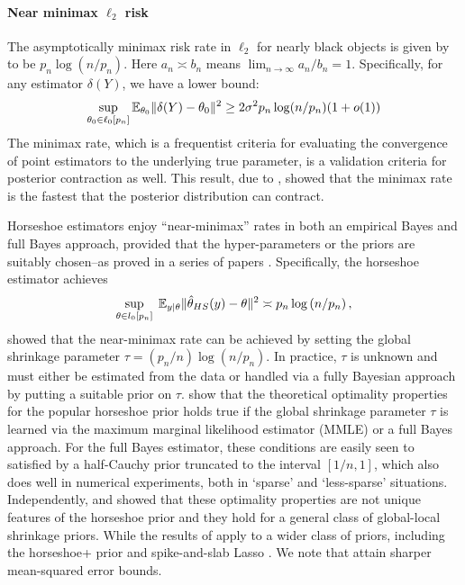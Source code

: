 \documentclass[11pt]{article}
\begin{document}
\paragraph{Near minimax $\ell_2$ risk}

The asymptotically minimax risk rate in $\ell_2$ for nearly black objects is
given by \citet{donoho1992maximum} to be $p_n \log \left ( n / p_n \right )$.
Here $a_n \asymp b_n$ means $\lim_{n\to\infty} a_n/b_n=1$. Specifically, for
any estimator $\delta(Y)$, we have a lower bound: 
\begin{equation}
  \sup_{\theta_0 \in \ell_0[p_n]} \mathbb E_{\theta_0} \lVert\delta(Y) - \theta_0\rVert^2
  \ge 2 \sigma^2 p_n \log(n/p_n)(1+o(1))
\end{equation}
The minimax rate, which is a frequentist criteria for evaluating the
convergence of point estimators to the underlying true parameter, is a
validation criteria for posterior contraction as well. This result, due to
\citet{ghosal2000}, showed that the minimax rate is the fastest that the
posterior distribution can contract. 

Horseshoe estimators enjoy ``near-minimax'' rates in both an empirical Bayes and
full Bayes approach, provided that the hyper-parameters or the priors are
suitably chosen--as proved in a series of papers
\citep{van2014horseshoe,van2015conditions,van2016many,van2017adaptive}.
Specifically, the horseshoe estimator achieves
\begin{equation}
  \sup_{ \theta \in l_0[p_n] } \; \mathbb{E}_{ y | \theta } \lVert {\hat{\theta}}_{HS}{} (y) -
  \theta \rVert^2 \asymp p_n \log \left ( n / p_n \right ), 
  \label{eq:minimax}
\end{equation}
\citet{van2014horseshoe} showed that the near-minimax rate can be achieved by
setting the global shrinkage parameter $\tau = (p_n/n) \log(n/p_n)$. In
practice, $\tau$ is unknown and must either be estimated from the data or
handled via a fully Bayesian approach by putting a suitable prior on $\tau$.
\cite{van2017adaptive} show that the theoretical optimality properties for the
popular horseshoe prior holds true if the global shrinkage parameter $\tau$ is
learned via the maximum marginal likelihood estimator (MMLE) or a full Bayes
approach. For the full Bayes estimator, these conditions are easily seen to
satisfied by a half-Cauchy prior truncated to the interval $[1/n,1]$, which
also does well in numerical experiments, both in `sparse' and `less-sparse'
situations. Independently, \citet{van2015conditions} and
\citet{ghosh2016asymptotic} showed that these optimality properties are not
unique features of the horseshoe prior and they hold for a general class of
global-local shrinkage priors. While the results of \cite{van2015conditions}
apply to a wider class of priors, including the horseshoe+ prior
\citep{bhadra2015horseshoe+} and spike-and-slab Lasso
\citep{rovckova2016spike}.  We note that \citet{ghosh2016asymptotic} attain
sharper mean-squared error bounds. 
\end{document}
